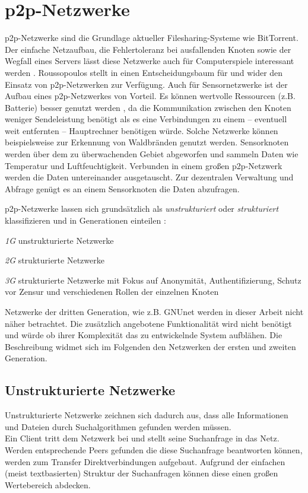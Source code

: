 \section{p2p-Netzwerke}
\label{chap:grundlagen:p2p}

p2p-Netzwerke sind die Grundlage aktueller Filesharing-Systeme wie BitTorrent. Der einfache Netzaufbau, die Fehlertoleranz bei ausfallenden Knoten sowie der Wegfall eines Servers lässt diese Netzwerke auch für Computerspiele interessant werden \cite{Knutsson2004Peertopeer, Triebel2008Peertopeer}. Roussopoulos stellt in \cite{Roussopoulos20032} einen Entscheidungsbaum für und wider den Einsatz von p2p-Netzwerken zur Verfügung. Auch für Sensornetzwerke ist der Aufbau eines p2p-Netzwerkes von Vorteil. Es können wertvolle Ressourcen (z.B. Batterie) besser genutzt werden \cite{MuneebAliandKoenLangendoen2007Case, Sioutas2009Building}, da die Kommunikation zwischen den Knoten weniger Sendeleistung benötigt als es eine Verbindungen zu einem -- eventuell weit entfernten -- Hauptrechner benötigen würde. Solche Netzwerke können beispielsweise zur Erkennung von Waldbränden genutzt werden. Sensorknoten werden über dem zu überwachenden Gebiet abgeworfen und sammeln Daten wie Temperatur und Luftfeuchtigkeit. Verbunden in einem großen p2p-Netzwerk werden die Daten untereinander ausgetauscht. Zur dezentralen Verwaltung und Abfrage genügt es an einem Sensorknoten die Daten abzufragen.

p2p-Netzwerke lassen sich grundsätzlich als \emph{unstrukturiert} oder \emph{strukturiert} klassifizieren \cite{Steinmetz2005, Lua2005Survey} und in Generationen einteilen \cite{Bo2003PeertoPeer}:
\begin{itemize*}
	\item \emph{1G} unstrukturierte Netzwerke
	\item \emph{2G} strukturierte Netzwerke
	\item \emph{3G} strukturierte Netzwerke mit Fokus auf Anonymität, Authentifizierung, Schutz vor Zensur und verschiedenen Rollen der einzelnen Knoten
\end{itemize*}

Netzwerke der dritten Generation, wie z.B. GNUnet \cite{Bennett2002GNet} werden in dieser Arbeit nicht näher betrachtet. Die zusätzlich angebotene Funktionalität wird nicht benötigt und würde ob ihrer Komplexität das zu entwickelnde System aufblähen. Die Beschreibung widmet sich im Folgenden den Netzwerken der ersten und zweiten Generation.

\subsection{Unstrukturierte Netzwerke}
Unstrukturierte Netzwerke zeichnen sich dadurch aus, dass alle Informationen und Dateien durch Suchalgorithmen \cite{Lv2002} gefunden werden müssen. \\
Ein Client tritt dem Netzwerk bei und stellt seine Suchanfrage in das Netz. Werden entsprechende Peers gefunden die diese Suchanfrage beantworten können, werden zum Transfer Direktverbindungen aufgebaut. Aufgrund der einfachen (meist textbasierten) Struktur der Suchanfragen können diese einen großen Wertebereich abdecken.

